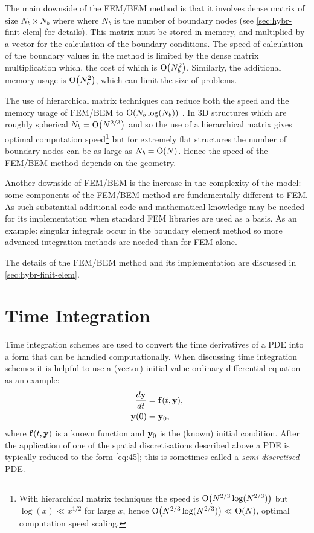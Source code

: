 The main downside of the FEM/BEM method is that it involves dense matrix of size $N_b \times N_b$ where where $N_b$ is the number of boundary nodes (see \cref{sec:hybr-finit-elem} for details).
This matrix must be stored in memory, and multiplied by a vector for the calculation of the boundary conditions.
The speed of calculation of the boundary values in the method is limited by the dense matrix multiplication which, the cost of which is $\text{O}{\left( N_b^2 \right)}$.
Similarly, the additional memory usage is $\text{O}{\left( N_b^2 \right)}$, which can limit the size of problems.

The use of hierarchical matrix techniques can reduce both the speed and the memory usage of FEM/BEM to $\text{O}{\left( N_b \log(N_b) \right)}$ \cite{Knittel2009}.
In 3D structures which are roughly spherical $N_b = \text{O}{\left( N^{2/3} \right)}$ and so the use of a hierarchical matrix gives optimal computation speed\footnote{With hierarchical matrix techniques the speed is $\text{O}{\left( N^{2/3}\log(N^{2/3}) \right)}$ but $\log(x) \ll x^{1/2}$ for large $x$, hence $\text{O}{\left( N^{2/3}\log(N^{2/3}) \right)} \ll \text{O}{\left( N \right)}$, \ie optimal computation speed scaling.} but for extremely flat structures the number of boundary nodes can be as large as $N_b = \text{O}{\left( N \right)}$.
Hence the speed of the FEM/BEM method depends on the geometry.

Another downside of FEM/BEM is the increase in the complexity of the model: some components of the FEM/BEM method are fundamentally different to FEM.
As such substantial additional code and mathematical knowledge may be needed for its implementation when standard FEM libraries are used as a basis.
As an example: singular integrals occur in the boundary element method so more advanced integration methods are needed than for FEM alone.

The details of the FEM/BEM method and its implementation are discussed in \cref{sec:hybr-finit-elem}.


\section{Time Integration}
\label{sec:time-discretisation}

Time integration schemes are used to convert the time derivatives of a PDE into a form that can be handled computationally. 
When discussing time integration schemes it is helpful to use a (vector) initial value ordinary differential equation as an example:
\begin{equation}
  \begin{aligned}
    \frac{d \mathbf{y}}{dt} &= {\mathbf{f}{\left( t, \mathbf{y} \right)}}, \\
    \mathbf{y}(0) &= \mathbf{y}_0,
    \label{eq:45}
  \end{aligned}
\end{equation}
where ${\mathbf{f}}(t,\mathbf{y})$ is a known function and $\mathbf{y}_0$ is the (known) initial condition.
After the application of one of the spatial discretisations described above a PDE is typically reduced to the form \cref{eq:45}; this is sometimes called a \emph{semi-discretised} PDE.

